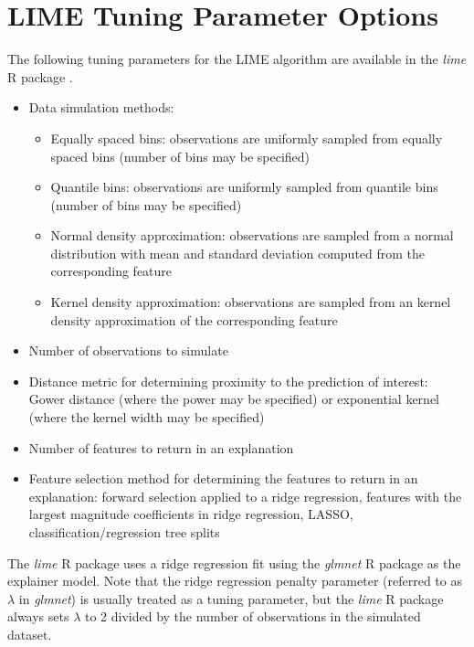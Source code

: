 \documentclass[AMS,STIX2COL]{WileyNJD-v2}\usepackage[]{graphicx}\usepackage[]{color}
\begin{document}
\appendix

\section{LIME Tuning Parameter Options} \label{lime-details}

The following tuning parameters for the LIME algorithm are available in the \emph{lime} R package \citep{pedersen:2020}.

\begin{itemize}

\item Data simulation methods:

\begin{itemize}
\item Equally spaced bins: observations are uniformly sampled from equally spaced bins (number of bins may be specified)
\item Quantile bins: observations are uniformly sampled from quantile bins (number of bins may be specified)
\item Normal density approximation: observations are sampled from a normal distribution with mean and standard deviation computed from the corresponding feature
\item Kernel density approximation: observations are sampled from an kernel density approximation of the corresponding feature
\end{itemize}

\item Number of observations to simulate

\item Distance metric for determining proximity to the prediction of interest: Gower distance (where the power may be specified) or exponential kernel (where the kernel width may be specified)

\item Number of features to return in an explanation

\item Feature selection method for determining the features to return in an explanation: forward selection applied to a ridge regression, features with the largest magnitude coefficients in ridge regression, LASSO, classification/regression tree splits

\end{itemize}

The \emph{lime} R package uses a ridge regression fit using the \emph{glmnet} R package \citep{simon:2011} as the explainer model. Note that the ridge regression penalty parameter (referred to as $\lambda$ in \emph{glmnet}) is usually treated as a tuning parameter, but the \emph{lime} R package always sets $\lambda$ to 2 divided by the number of observations in the simulated dataset.
\end{document}
